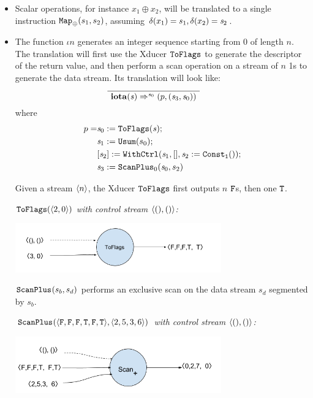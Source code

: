 \begin{itemize}
	\item Scalar operations, for instance $x_1 \oplus x_2$, will be translated to a single instruction $\map{\oplus}(s_1,s_2)$, assuming $\del(x_1) = s_1, \del(x_2) = \s_2$.
	
	\item The function $\iota{n}$  generates an integer sequence starting from 0 of length $n$.  
	The translation will first use the Xducer $\toflag$ to generate the descriptor of the return value, and then perform a scan operation on a stream of $n$ 1s to generate the data stream.
	Its translation will look like: 
	$$	\PT{
		\Axiom{\Transf{\iotan}{\s}{\s_0}{}{\sfun{p} {(\s_3,\s_0)}}}
	}$$
	where 
	\begin{align*}
			p= & \sdef{\s_0}{\toflag(\s)} ; \\ 
			& \sdef{\s_1}{\usum(s_0)} ; \\
			& \withctrl{\s_1}{\sdef{\s_2}{\consta{1}()}}{[]}{[\s_2]}; \\
			& \sdef{\s_3}{\scan_{0}(\s_0,s_2)}
		\end{align*}

Given a stream $\singl{n}$, the Xducer $\toflag$ first outputs $n$ $\F$s, then one $\T$.

\begin{example} \emph{$\toflagf{\<2,0\'>}$  with control stream $\<(),()\'>$:}\\
	\begin{center}
		\includegraphics[width=0.7\textwidth]{fig/toflagsxducer.png}
	\end{center}
\end{example}

$\scan_{}(s_b,s_d)$ performs an exclusive scan on the data stream $s_d$ segmented by $s_b$.
\begin{example} \emph{$\scan_{}(\<\F,\F,\F,\T,\F,\T\'>, \< 2,5,3,6 \'>)$  with control stream $\<(),()\'>$: }\\
	\begin{center}
		\includegraphics[width=0.7\textwidth]{fig/scanxducer.png}
	\end{center}
\end{example}




\end{itemize}
